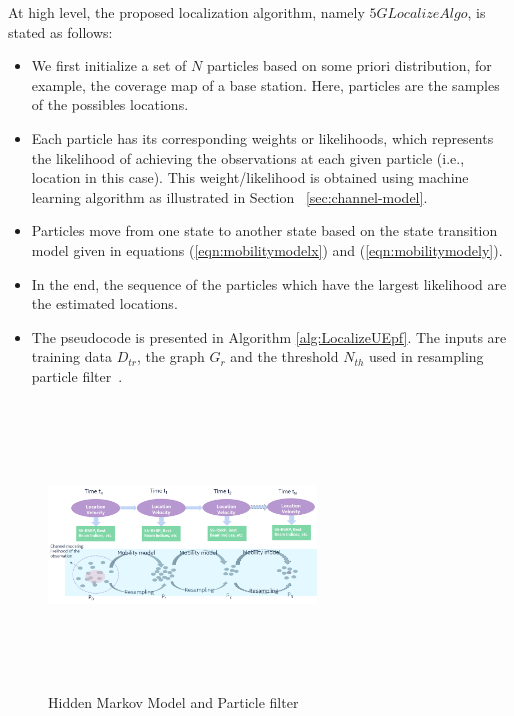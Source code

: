 \documentclass[conference, 10pt]{IEEEtran}
\begin{document}
\begin{NoHyper}
At high level, the proposed localization algorithm, namely $5GLocalizeAlgo$, is stated as follows:
\begin{itemize}
	\item We first initialize a set of $N$ particles based on some priori distribution, for example, the coverage map of a base station.
	Here, particles are the samples of the possibles locations. 
	\item Each particle has its corresponding weights or likelihoods, which represents the likelihood of achieving the observations at each given particle (i.e., location in this case). This weight/likelihood is obtained using machine learning algorithm as illustrated in Section ~\ref{sec:channel-model}.
	\item Particles move from one state to another state based 
	on the state transition model given in equations (\ref{eqn:mobilitymodelx}) and (\ref{eqn:mobilitymodely}).
	\item In the end, the sequence of the particles which have the largest likelihood are the estimated locations. 
	\item The pseudocode is presented in Algorithm \ref{alg:LocalizeUEpf}. The inputs are training data $D_{tr}$, the graph $G_r$ and the threshold $N_{th}$ used in resampling particle filter~\cite{ThrunParticleFilter}.
\end{itemize}

\begin{figure}[t]
	\begin{center}
	\includegraphics[height=3in,width=2.8in]{./HMM_ParticleFilter_Illustration.png}
	\caption{\label{fig:hmm_particle}
	{\small Hidden Markov Model and Particle filter}}
	\end{center}
	\end{figure}


\end{NoHyper}
\end{document}
